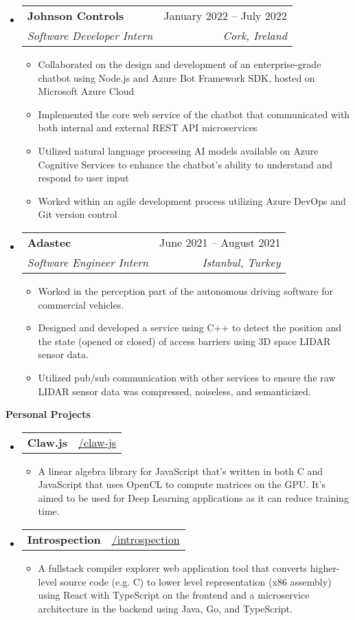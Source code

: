 \documentclass[letterpaper,12pt]{article}[leftmargin=*]
\makeatletter
\def \githubicon {\faGithub}
\def \entryspacing {-0pt}
\renewcommand{\section}[2]{\vspace{5pt}
  \colorbox{secondary}{\color{white}\raggedbottom\normalsize\textbf{{#1}{\hspace{7pt}#2}}}
}
\newcommand{\resumeEntryStart}{\begin{itemize}[leftmargin=2.5mm]}
\newcommand{\resumeEntryEnd}{\end{itemize}\vspace{\entryspacing}}
\newcommand{\resumeItemListStart}{\begin{itemize}[leftmargin=4.5mm]}
\newcommand{\resumeItemListEnd}{\end{itemize}}
\newcommand{\resumeItem}[1]{
  \item\small{
    {#1 \vspace{-2pt}}
  }
}
\newcommand{\resumeEntryTSDL}[4]{
  \vspace{-1pt}\item[]
    \begin{tabularx}{0.97\textwidth}{X@{\hspace{60pt}}r}
      \textbf{\color{primary}#1} & {\firabook\color{accent}\small#2} \\
      \textit{\color{accent}\small#3} & \textit{\color{accent}\small#4} \\
    \end{tabularx}\vspace{-6pt}
}
\newcommand{\resumeEntryTD}[2]{
  \vspace{-1pt}\item[]
    \begin{tabularx}{0.97\textwidth}{X@{\hspace{60pt}}r}
      \textbf{\color{primary}#1} & {\firabook\color{accent}\small#2} \\
    \end{tabularx}\vspace{-6pt}
}
\makeatother
\begin{document}
  \resumeEntryStart
    \resumeEntryTSDL
      {Johnson Controls}{January 2022 -- July 2022}
      {Software Developer Intern}{Cork, Ireland}
    \resumeItemListStart
      \resumeItem {Collaborated on the design and development of an enterprise-grade chatbot using Node.js and Azure Bot Framework SDK, hosted on Microsoft Azure Cloud}
      \resumeItem {Implemented the core web service of the chatbot that communicated with both internal and external REST API microservices}
      \resumeItem {Utilized natural language processing AI models available on Azure Cognitive Services to enhance the chatbot's ability to understand and respond to user input}
      \resumeItem {Worked within an agile development process utilizing Azure DevOps and Git version control}
    \resumeItemListEnd
  \resumeEntryEnd

  \resumeEntryStart
    \resumeEntryTSDL
      {Adastec}{June 2021 -- August 2021}
      {Software Engineer Intern}{Istanbul, Turkey}
    \resumeItemListStart
      \resumeItem {Worked in the perception part of the autonomous driving software for commercial vehicles.}
      \resumeItem {Designed and developed a service using C++ to detect the position and the state (opened or closed) of access barriers using 3D space LIDAR sensor data.}
      \resumeItem {Utilized pub/sub communication with other services to ensure the raw LIDAR sensor data was compressed, noiseless, and semanticized.}
    \resumeItemListEnd
  \resumeEntryEnd


\section{\faFlask}{Personal Projects}

  \resumeEntryStart
    \resumeEntryTD
      {Claw.js}{\githubicon \href{https://github.com/tussoftwaredesign/claw-js}{ /claw-js}}
    \resumeItemListStart
      \resumeItem {A linear algebra library for JavaScript that's written in both C and JavaScript that uses OpenCL to compute matrices on the GPU. It's aimed to be used for Deep Learning applications as it can reduce training time.}
    \resumeItemListEnd
  \resumeEntryEnd

  \pagebreak

  \resumeEntryStart
    \resumeEntryTD
      {Introspection}{\githubicon \href{https://github.com/yvesyil/introspection}{ /introspection}}
    \resumeItemListStart
      \resumeItem {A fullstack compiler explorer web application tool that converts higher-level source code (e.g. C) to lower level representation (x86 assembly) using React with TypeScript on the frontend and a microservice architecture in the backend using Java, Go, and TypeScript.}
    \resumeItemListEnd
  \resumeEntryEnd
\end{document}

